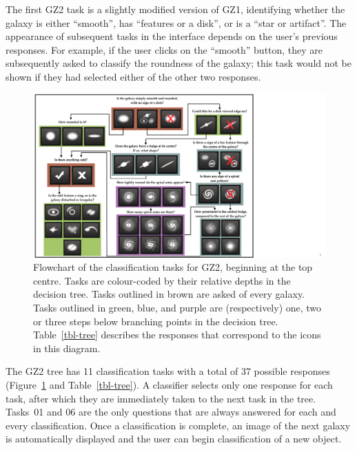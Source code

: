 \documentclass[useAMS,usenatbib]{mn2e}
\begin{document}
The first GZ2 task is a slightly modified version of GZ1, identifying whether the galaxy is either ``smooth'', has ``features or a disk'', or is a ``star or artifact''. The appearance of subsequent tasks in the interface depends on the user's previous responses. For example, if the user clicks on the ``smooth'' button, they are subsequently asked to classify the roundness of the galaxy; this task would not be shown if they had selected either of the other two responses. 

\begin{figure}
\includegraphics[angle=0,width=7.0in]{figures/flowchart.pdf}
\caption{Flowchart of the classification tasks for GZ2, beginning at the top centre. Tasks are colour-coded by their relative depths in the decision tree. Tasks outlined in brown are asked of every galaxy. Tasks outlined in green, blue, and purple are (respectively) one, two or three steps below branching points in the decision tree. Table~\ref{tbl-tree} describes the responses that correspond to the icons in this diagram.
\label{fig-flowchart}}
\end{figure}

The GZ2 tree has 11 classification tasks with a total of 37 possible responses (Figure~\ref{fig-flowchart} and Table~\ref{tbl-tree}). A classifier selects only one response for each task, after which they are immediately taken to the next task in the tree. Tasks~01 and 06 are the only questions that are always answered for each and every classification. Once a classification is complete, an image of the next galaxy is automatically displayed and the user can begin classification of a new object. 
\end{document}
